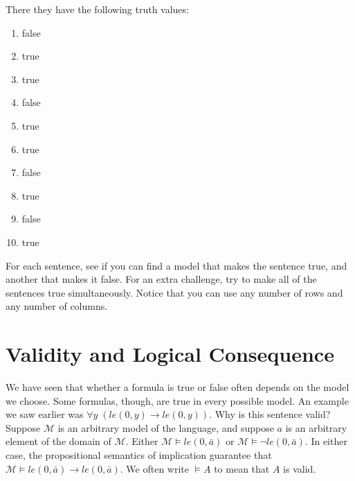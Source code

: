 \documentclass[letterpaper,10pt,english]{sphinxmanual}
\begin{document}
\sphinxAtStartPar
There they have the following truth values:
\begin{enumerate}
%
\item {} 
\sphinxAtStartPar
false

\item {} 
\sphinxAtStartPar
true

\item {} 
\sphinxAtStartPar
true

\item {} 
\sphinxAtStartPar
false

\item {} 
\sphinxAtStartPar
true

\item {} 
\sphinxAtStartPar
true

\item {} 
\sphinxAtStartPar
false

\item {} 
\sphinxAtStartPar
true

\item {} 
\sphinxAtStartPar
false

\item {} 
\sphinxAtStartPar
true

\end{enumerate}

\sphinxAtStartPar
For each sentence, see if you can find a model that makes the sentence true, and another that makes it false. For an extra challenge, try to make all of the sentences true simultaneously. Notice that you can use any number of rows and any number of columns.


\section{Validity and Logical Consequence}
\label{\detokenize{semantics_of_first_order_logic:validity-and-logical-consequence}}
\sphinxAtStartPar
We have seen that whether a formula is true or false often depends on the model we choose. Some formulas, though, are true in every possible model. An example we saw earlier was \(\forall y \; (\mathit{le}(0, y) \to \mathit{le}(0, y))\). Why is this sentence valid? Suppose \({\mathcal M}\) is an arbitrary model of the language, and suppose \(a\) is an arbitrary element of the domain of \({\mathcal M}\). Either \({\mathcal M} \models \mathit{le}(0, \bar a)\) or \({\mathcal M} \models \neg \mathit{le}(0, \bar a)\). In either case, the propositional semantics of implication guarantee that \({\mathcal M} \models \mathit{le}(0, \bar a) \to \mathit{le}(0, \bar a)\). We often write \(\models A\) to mean that \(A\) is valid.
\end{document}
